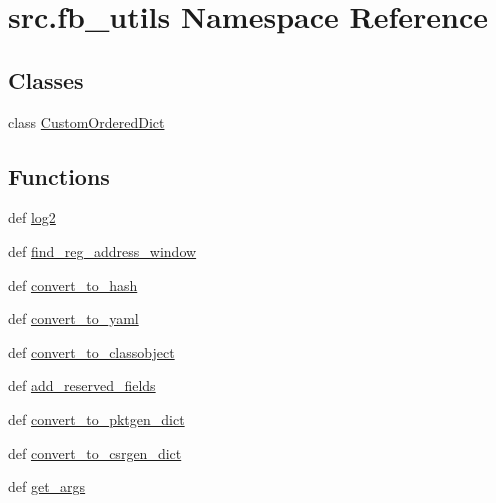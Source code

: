\hypertarget{namespacesrc_1_1fb__utils}{\section{src.\-fb\-\_\-utils Namespace Reference}
\label{namespacesrc_1_1fb__utils}
}
\subsection*{Classes}
\begin{DoxyCompactItemize}
\item 
class \hyperlink{classsrc_1_1fb__utils_1_1CustomOrderedDict}{Custom\-Ordered\-Dict}
\end{DoxyCompactItemize}
\subsection*{Functions}
\begin{DoxyCompactItemize}
\item 
def \hyperlink{namespacesrc_1_1fb__utils_a1f7b800c7bab31bda6ce5cbd9ba38fd3}{log2}
\item 
def \hyperlink{namespacesrc_1_1fb__utils_a45487cf802f5b6877a516ec72bc42d0a}{find\-\_\-reg\-\_\-address\-\_\-window}
\item 
def \hyperlink{namespacesrc_1_1fb__utils_ab9117334b5df6957ba2a7b5606311b6a}{convert\-\_\-to\-\_\-hash}
\item 
def \hyperlink{namespacesrc_1_1fb__utils_ac084200b504b1ced03282c5ece09a15e}{convert\-\_\-to\-\_\-yaml}
\item 
def \hyperlink{namespacesrc_1_1fb__utils_aecdd746d8b9047e4a54cc0c3fa49f957}{convert\-\_\-to\-\_\-classobject}
\item 
def \hyperlink{namespacesrc_1_1fb__utils_a4f30a6b26ecce4f7c6203c9170b6305d}{add\-\_\-reserved\-\_\-fields}
\item 
def \hyperlink{namespacesrc_1_1fb__utils_afcb166e6d04cfb6dcbcdc55ebfe929b8}{convert\-\_\-to\-\_\-pktgen\-\_\-dict}
\item 
def \hyperlink{namespacesrc_1_1fb__utils_a20116237b47d935b0dbb178070e12ce5}{convert\-\_\-to\-\_\-csrgen\-\_\-dict}
\item 
def \hyperlink{namespacesrc_1_1fb__utils_aad04c3f6f86fd030376616ce4251e4dc}{get\-\_\-args}
\end{DoxyCompactItemize}
